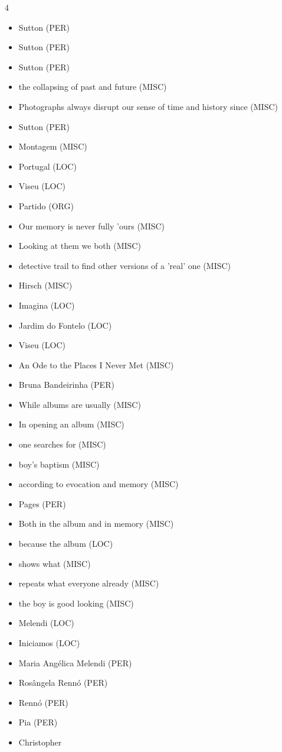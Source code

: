 \documentclass{article}
\begin{document}
\begin{multicols}{4}
\begin{itemize}
\item Sutton (PER)
\item Sutton (PER)
\item Sutton (PER)
\item the collapsing of past and future (MISC)
\item Photographs always disrupt our sense of time and history since (MISC)
\item Sutton (PER)
\item Montagem (MISC)
\item Portugal (LOC)
\item Viseu (LOC)
\item Partido (ORG)
\item Our memory is never fully 'ours (MISC)
\item Looking at them we both (MISC)
\item detective trail to find other versions of a 'real' one (MISC)
\item Hirsch (MISC)
\item Imagina (LOC)
\item Jardim do Fontelo (LOC)
\item Viseu (LOC)
\item An  Ode  to  the  Places  I  Never  Met (MISC)
\item Bruna Bandeirinha (PER)
\item While albums are usually (MISC)
\item In opening 
an album (MISC)
\item one searches for (MISC)
\item boy's baptism (MISC)
\item according to evocation and memory (MISC)
\item Pages (PER)
\item Both in the album and in memory (MISC)
\item because the album (LOC)
\item shows what (MISC)
\item repeats 
what everyone already (MISC)
\item the boy is good looking (MISC)
\item Melendi (LOC)
\item Iniciamos (LOC)
\item Maria Angélica Melendi (PER)
\item Rosângela  Rennó (PER)
\item Rennó (PER)
\item Pia (PER)
\item Christopher 

\end{itemize}
\end{multicols}
\end{document}

